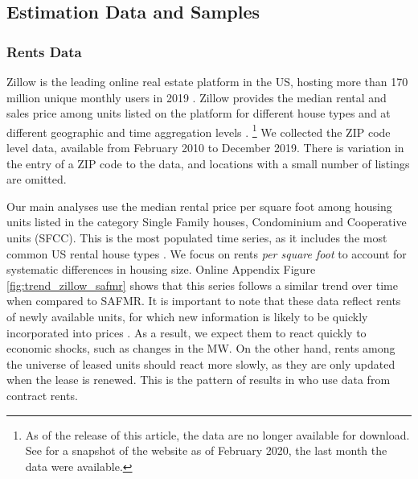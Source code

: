 \subsection{Estimation Data and Samples}

\subsubsection{Rents Data}
\label{sec:data_rents}

Zillow is the leading online real estate platform in the US, hosting more than 
170 million unique monthly users in 2019 \parencite{ZillowFacts}.
Zillow provides the median rental and sales price among units listed on the 
platform for different house types and at different geographic and time 
aggregation levels \parencite{ZillowData}.%
\footnote{As of the release of this article, the data are no longer available 
    for download.
    See \textcite{ZillowDataArchive} for a snapshot of the website as of 
    February 2020, the last month the data were available.}
We collected the ZIP code level data, available from February 2010 
to December 2019.
There is variation in the entry of a ZIP code to the data, and locations with a 
small number of listings are omitted. %

Our main analyses use the median rental price per square foot among housing 
units listed in the category Single Family houses, Condominium and Cooperative 
units (SFCC).
This is the most populated time series, as it includes the most common US 
rental house types \parencite{Fernald2020}.
We focus on rents \textit{per square foot} to account for systematic 
differences in housing size.
Online Appendix Figure \ref{fig:trend_zillow_safmr} shows that this series 
follows a similar trend over time when compared to SAFMR.
It is important to note that these data reflect rents of newly available 
units, for which new information is likely to be quickly incorporated into 
prices \parencite{AmbroseEtAl2015}.
As a result, we expect them to react quickly to economic shocks, such as 
changes in the MW.
On the other hand, rents among the universe of leased units should react 
more slowly, as they are only updated when the lease is renewed.
This is the pattern of results in \textcite{AgarwalEtAl2022} who use
data from contract rents.


